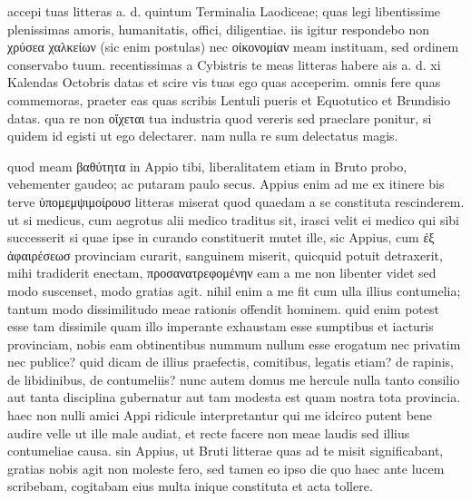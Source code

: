 


 accepi tuas litteras a. d. quintum Terminalia Laodiceae; quas legi libentissime plenissimas amoris, humanitatis, offici, diligentiae. iis igitur respondebo non χρύσεα χαλκείων (sic enim postulas) nec οἰκονομίαν meam instituam, sed ordinem conservabo tuum. recentissimas a Cybistris te meas litteras habere ais a. d. xi Kalendas Octobris datas et scire vis tuas ego quas acceperim. omnis fere quas commemoras, praeter eas quas scribis Lentuli pueris et Equotutico et Brundisio datas. qua re non οἴχεται tua industria quod vereris sed praeclare ponitur, si quidem id egisti ut ego delectarer. nam nulla re sum delectatus magis.

 quod meam βαθύτητα in Appio tibi, liberalitatem etiam in Bruto probo, vehementer gaudeo; ac putaram paulo secus. Appius enim ad me ex itinere bis terve ὑπομεμψιμοίρουσ litteras miserat quod quaedam a se constituta rescinderem. ut si medicus, cum aegrotus alii medico traditus sit, irasci velit ei medico qui sibi successerit si quae ipse in curando constituerit mutet ille, sic Appius, cum ἐξ ἀφαιρέσεωσ provinciam curarit, sanguinem miserit, quicquid potuit detraxerit, mihi tradiderit enectam, προσανατρεφομένην eam a me non libenter videt sed modo suscenset, modo gratias agit. nihil enim a me fit cum ulla illius contumelia; tantum modo dissimilitudo meae rationis offendit hominem. quid enim potest esse tam dissimile quam illo imperante exhaustam esse sumptibus et iacturis provinciam, nobis eam obtinentibus nummum nullum esse erogatum nec privatim nec publice? quid dicam de illius praefectis, comitibus, legatis etiam? de rapinis, de libidinibus, de contumeliis? nunc autem domus me hercule nulla tanto consilio aut tanta disciplina gubernatur aut tam modesta est quam nostra tota provincia. haec non nulli amici Appi ridicule interpretantur qui me idcirco putent bene audire velle ut ille male audiat, et recte facere non meae laudis sed illius contumeliae causa. sin Appius, ut Bruti litterae quas ad te misit significabant, gratias nobis agit non moleste fero, sed tamen eo ipso die quo haec ante lucem scribebam, cogitabam eius multa inique constituta et acta tollere.

